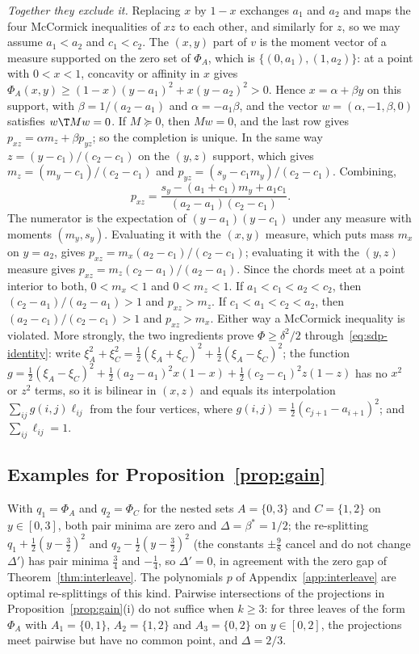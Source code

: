 \emph{Together they exclude it.} Replacing $x$ by $1-x$ exchanges $a_1$ and $a_2$
and maps the four McCormick inequalities of $xz$ to each other, and similarly
for $z$, so we may assume $a_1<a_2$ and $c_1<c_2$. The $(x,y)$ part of $v$ is
the moment vector of a measure supported on the zero set of $\Phi_A$, which is
$\{(0,a_1),(1,a_2)\}$: at a point with $0<x<1$, concavity or affinity in $x$
gives $\Phi_A(x,y)\ge(1-x)(y-a_1)^2+x(y-a_2)^2>0$. Hence $x=\alpha+\beta y$ on this
support, with $\beta=1/(a_2-a_1)$ and $\alpha=-a_1\beta$, and the vector
$w=(\alpha,-1,\beta,0)$ satisfies $w\T Mw=0$. If $M\succeq0$, then $Mw=0$, and the
last row gives $p_{xz}=\alpha m_z+\beta p_{yz}$; so the completion is unique. In
the same way $z=(y-c_1)/(c_2-c_1)$ on the $(y,z)$ support, which gives
$m_z=(m_y-c_1)/(c_2-c_1)$ and $p_{yz}=(s_y-c_1m_y)/(c_2-c_1)$. Combining,
\[
p_{xz}=\frac{s_y-(a_1+c_1)m_y+a_1c_1}{(a_2-a_1)(c_2-c_1)}.
\]
The numerator is the expectation of $(y-a_1)(y-c_1)$ under any measure with
moments $(m_y,s_y)$. Evaluating it with the $(x,y)$ measure, which puts mass
$m_x$ on $y=a_2$, gives $p_{xz}=m_x(a_2-c_1)/(c_2-c_1)$; evaluating it with the
$(y,z)$ measure gives $p_{xz}=m_z(c_2-a_1)/(a_2-a_1)$. Since the chords meet at
a point interior to both, $0<m_x<1$ and $0<m_z<1$. If $a_1<c_1<a_2<c_2$, then
$(c_2-a_1)/(a_2-a_1)>1$ and $p_{xz}>m_z$. If $c_1<a_1<c_2<a_2$, then
$(a_2-c_1)/(c_2-c_1)>1$ and $p_{xz}>m_x$. Either way a McCormick inequality is
violated. More strongly, the two ingredients prove $\Phi\ge\delta^2/2$
through~\eqref{eq:sdp-identity}: write
$\xi_A^2+\xi_C^2=\tfrac12(\xi_A+\xi_C)^2+\tfrac12(\xi_A-\xi_C)^2$; the function
$g=\tfrac12(\xi_A-\xi_C)^2+\tfrac12(a_2-a_1)^2x(1-x)+\tfrac12(c_2-c_1)^2z(1-z)$ has no
$x^2$ or $z^2$ terms, so it is bilinear in $(x,z)$ and equals its interpolation
$\sum_{ij}g(i,j)\ell_{ij}$ from the four vertices, where
$g(i,j)=\tfrac12(c_{j+1}-a_{i+1})^2$; and $\sum_{ij}\ell_{ij}=1$.

\subsection{Examples for Proposition~\ref{prop:gain}}\label{app:gain-examples}

With $q_1=\Phi_A$ and $q_2=\Phi_C$ for the nested sets $A=\{0,3\}$ and
$C=\{1,2\}$ on $y\in[0,3]$, both pair minima are zero and
$\Delta=\beta^\ast=1/2$; the re-splitting $q_1+\tfrac12(y-\tfrac32)^2$ and
$q_2-\tfrac12(y-\tfrac32)^2$ (the constants $\pm\tfrac98$ cancel and do not
change $\Delta'$) has pair minima $\tfrac34$ and $-\tfrac14$, so $\Delta'=0$, in agreement with the zero gap of Theorem~\ref{thm:interleave}. The
polynomials $p$ of Appendix~\ref{app:interleave} are optimal re-splittings of
this kind. Pairwise intersections of the projections in
Proposition~\ref{prop:gain}(i) do not suffice when $k\ge3$: for three leaves of
the form $\Phi_A$ with $A_1=\{0,1\}$, $A_2=\{1,2\}$ and $A_3=\{0,2\}$ on
$y\in[0,2]$, the projections meet pairwise but have no common point, and
$\Delta=2/3$.

